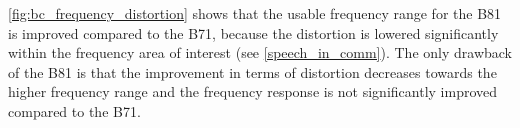 \autoref{fig:bc_frequency_distortion} shows that the usable frequency range for the B81 is improved compared to the B71, because the distortion is lowered significantly within the frequency area of interest (see \autoref{speech_in_comm}). The only drawback of the B81 is that the improvement in terms of distortion decreases towards the higher frequency range and the frequency response is not significantly improved compared to the B71. 










